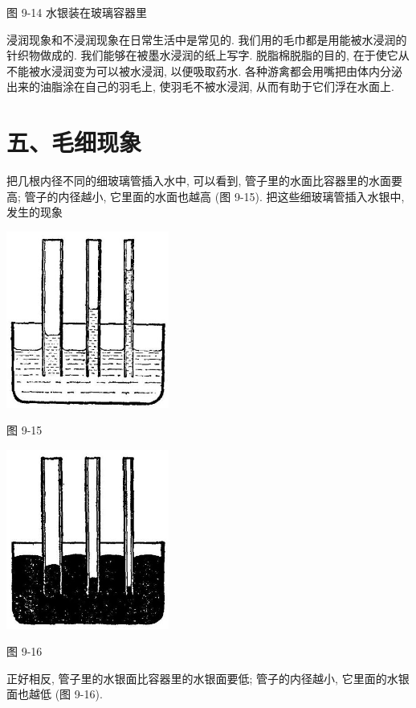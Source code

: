 \documentclass[10pt]{article}
\begin{document}
图 9-14 水银装在玻璃容器里

浸润现象和不浸润现象在日常生活中是常见的. 我们用的毛巾都是用能被水浸润的针织物做成的. 我们能够在被墨水浸润的纸上写字. 脱脂棉脱脂的目的, 在于使它从不能被水浸润变为可以被水浸润, 以便吸取药水. 各种游禽都会用嘴把由体内分泌出来的油脂涂在自己的羽毛上, 使羽毛不被水浸润, 从而有助于它们浮在水面上.

\section*{五、毛细现象}

把几根内径不同的细玻璃管插入水中, 可以看到, 管子里的水面比容器里的水面要高; 管子的内径越小, 它里面的水面也越高 (图 9-15). 把这些细玻璃管插入水银中, 发生的现象

\begin{center}
\includegraphics[max width=0.4\textwidth]{images/01912d55-147c-70aa-b0e0-1782a122f948_270_843062.jpg}
\end{center}

图 9-15

\begin{center}
\includegraphics[max width=0.4\textwidth]{images/01912d55-147c-70aa-b0e0-1782a122f948_270_816183.jpg}
\end{center}

图 9-16

正好相反, 管子里的水银面比容器里的水银面要低; 管子的内径越小, 它里面的水银面也越低 (图 9-16).
\end{document}
